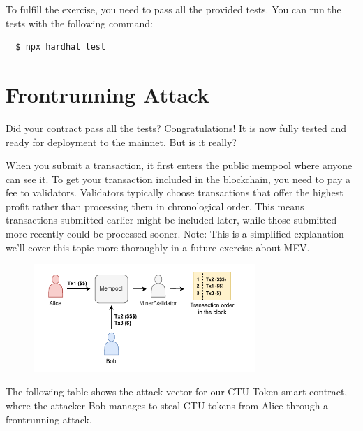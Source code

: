 \documentclass[12pt]{article}
\begin{document}
\noindent
To fulfill the exercise, you need to pass all the provided tests. You can run the tests with the following command:
\begin{verbatim}
  $ npx hardhat test
\end{verbatim}

\section{Frontrunning Attack}

Did your contract pass all the tests? Congratulations! It is now fully tested and ready for deployment to the mainnet. But is it really?

When you submit a transaction, it first enters the public mempool where anyone can see it. To get your transaction included in the blockchain, you need to pay a fee to validators. Validators typically choose transactions that offer the highest profit rather than processing them in chronological order. This means transactions submitted earlier might be included later, while those submitted more recently could be processed sooner. Note: This is a simplified explanation — we'll cover this topic more thoroughly in a future exercise about MEV.

\begin{figure}[H]
\centering
\includegraphics[width=0.75\textwidth]{sandwich.pdf}
\label{fig:frontrunning}
\end{figure}

The following table shows the attack vector for our CTU Token smart contract, where the attacker Bob manages to steal CTU tokens from Alice through a frontrunning attack.
\end{document}
